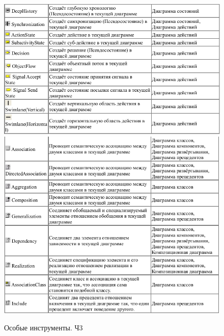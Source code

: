 \documentclass[a4paper,12pt]{extreport}
\begin{document}
\begin{figure}
	\centering
	\includegraphics[width=0.9\linewidth]{images/diffinstruments4}
	\includegraphics[width=0.9055\linewidth]{images/diffinstruments5}
	\caption{Особые инструменты. Ч3}
	\label{fig:diffinstruments3}
\end{figure}
\end{document}
